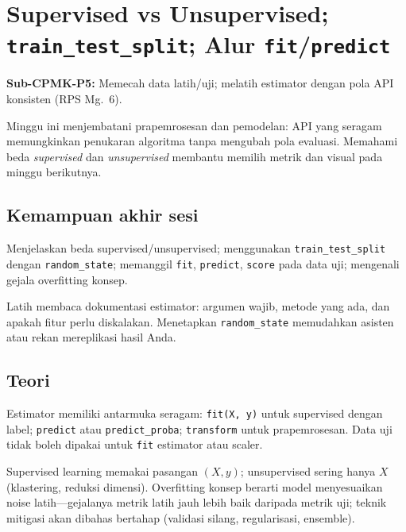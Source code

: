 \documentclass[../main.tex]{subfiles}
\begin{document}
\chapter{Supervised vs Unsupervised; \texttt{train\_test\_split}; Alur \texttt{fit}/\texttt{predict}}

\begin{subcpmk}
  \item \textbf{Sub-CPMK-P5:} Memecah data latih/uji; melatih estimator \sklearn{} dengan pola API konsisten (RPS Mg.\ 6).
\end{subcpmk}


\noindent Minggu ini menjembatani prapemrosesan dan pemodelan: API \sklearn{} yang seragam memungkinkan penukaran algoritma tanpa mengubah pola evaluasi. Memahami beda \textit{supervised} dan \textit{unsupervised} membantu memilih metrik dan visual pada minggu berikutnya.

\section{Kemampuan akhir sesi}

Menjelaskan beda supervised/unsupervised; menggunakan \texttt{train\_test\_split} dengan \texttt{random\_state}; memanggil \texttt{fit}, \texttt{predict}, \texttt{score} pada data uji; mengenali gejala overfitting konsep.

Latih membaca dokumentasi estimator: argumen wajib, metode yang ada, dan apakah fitur perlu diskalakan. Menetapkan \texttt{random\_state} memudahkan asisten atau rekan mereplikasi hasil Anda.

\section{Teori}

\begin{konsep}
Estimator \sklearn{} memiliki antarmuka seragam: \texttt{fit(X, y)} untuk supervised dengan label; \texttt{predict} atau \texttt{predict\_proba}; \texttt{transform} untuk prapemrosesan. Data uji tidak boleh dipakai untuk \texttt{fit} estimator atau scaler.
\end{konsep}

Supervised learning memakai pasangan $(X, y)$; unsupervised sering hanya $X$ (klastering, reduksi dimensi). Overfitting konsep berarti model menyesuaikan noise latih---gejalanya metrik latih jauh lebih baik daripada metrik uji; teknik mitigasi akan dibahas bertahap (validasi silang, regularisasi, ensemble).
\end{document}
